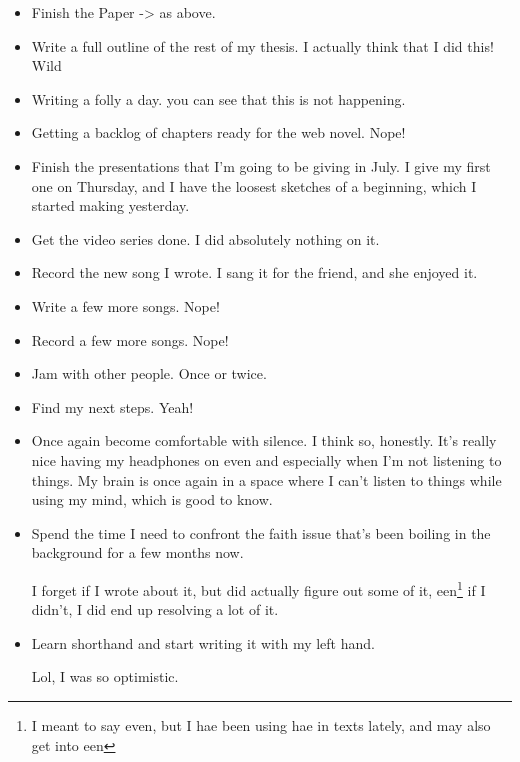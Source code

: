 \documentclass[12pt]{article}
\renewcommand{\,}{\textsuperscript{,}}
\begin{document}
\begin{itemize}

\item Finish the Paper -> as above.

\item Write a full outline of the rest of my thesis. I actually think that I did this! Wild

\item Writing a folly a day. you can see that this is not happening.

\item Getting a backlog of chapters ready for the web novel. Nope!

\item Finish the presentations that I'm going to be giving in July. I give my first one on Thursday, and I have the loosest sketches of a beginning, which I started making yesterday.

\item Get the video series done. I did absolutely nothing on it.

\item Record the new song I wrote. I sang it for the friend, and she enjoyed it.

\item Write a few more songs. Nope!

\item Record a few more songs. Nope!

\item Jam with other people. Once or twice.

\item Find my next steps. Yeah!

\item Once again become comfortable with silence. I think so, honestly. It's really nice having my headphones on even and especially when I'm not listening to things.  
My brain is once again in a space where I can't listen to things while using my mind, which is good to know.

\item Spend the time I need to confront the faith issue that's been boiling in the background for a few months now.

I forget if I wrote about it, but did actually figure out some of it, een\footnote{I meant to say even, but I hae been using hae in texts lately, and may also get into een} if I didn't, I did end up resolving a lot of it.

\item Learn shorthand and start writing it with my left hand.

Lol, I was so optimistic.

\end{itemize}
\end{document}
